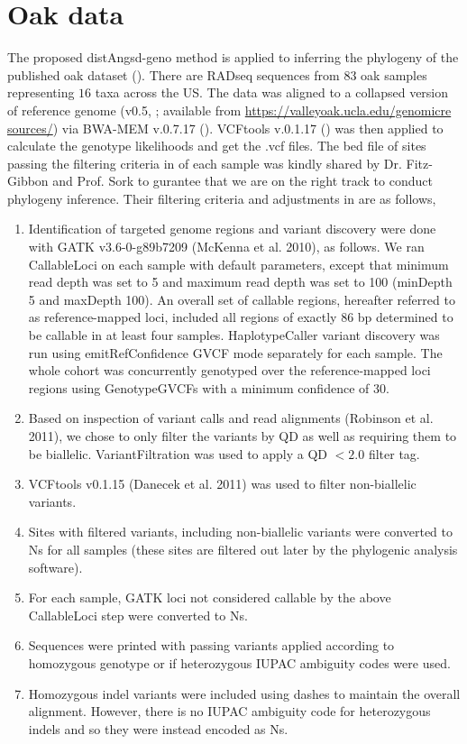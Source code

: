 \documentclass{article}
\begin{document}
\section{Oak data}
The proposed distAngsd-geno method is applied to inferring the phylogeny of the published oak dataset (\cite{Fitz-Gibbon_Hipp_Pham_Manos_Sork:2017}). There are RADseq sequences from $83$ oak samples representing $16$ taxa across the US. The data was aligned to a collapsed version of reference genome (v0.5, \cite{Sork:2016}; available from \url{https://valleyoak.ucla.edu/genomicre sources/}) via BWA-MEM v.0.7.17 (\cite{Li:2013}). VCFtools v.0.1.17 (\cite{Danecek:2011}) was then applied to calculate the genotype likelihoods and get the .vcf files. The bed file of sites passing the filtering criteria in \cite{Fitz-Gibbon_Hipp_Pham_Manos_Sork:2017} of each sample was kindly shared by Dr. Fitz-Gibbon and Prof. Sork to gurantee that we are on the right track to conduct phylogeny inference. Their filtering criteria and adjustments in are as follows,
\begin{enumerate}[i]
    \item Identification of targeted genome regions and variant discovery were done with GATK v3.6-0-g89b7209 (McKenna et al. 2010), as follows. We ran CallableLoci on each sample with default parameters, except that minimum read depth was set to 5 and maximum read depth was set to 100 (minDepth 5 and maxDepth 100). An overall set of callable regions, hereafter referred to as reference-mapped loci, included all regions of exactly 86 bp determined to be callable in at least four samples. HaplotypeCaller variant discovery was run using emitRefConfidence GVCF mode separately for each sample. The whole cohort was concurrently genotyped over the reference-mapped loci regions using GenotypeGVCFs with a minimum confidence of 30.
    \item Based on inspection of variant calls and read alignments (Robinson et al. 2011), we chose to only filter the variants by QD as well as requiring them to be biallelic. VariantFiltration was used to apply a QD $< 2.0$ filter tag. 
    \item VCFtools v0.1.15 (Danecek et al. 2011) was used to filter non-biallelic variants. 
    \item Sites with filtered variants, including non-biallelic variants were converted to Ns for all samples (these sites are filtered out later by the phylogenic analysis software).
    \item For each sample, GATK loci not considered callable by the above CallableLoci step were converted to Ns.
    \item Sequences were printed with passing variants applied according to homozygous genotype or if heterozygous IUPAC ambiguity codes were used.
    \item Homozygous indel variants were included using dashes to maintain the overall alignment. However, there is no IUPAC ambiguity code for heterozygous indels and so they were instead encoded as Ns.
\end{enumerate}
\end{document}
